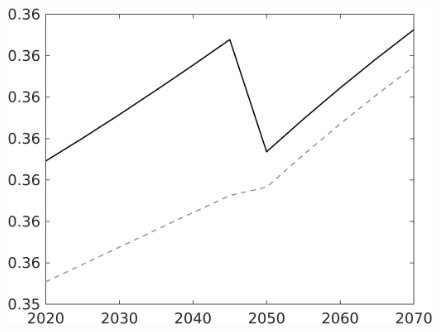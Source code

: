 \begin{figure}[h!!!]
\begin{minipage}[]{0.32\textwidth}
	\end{minipage}
	\begin{minipage}[]{0.32\textwidth}
		\includegraphics[width=1\textwidth]{../../codding_model/own_basedOnFried/optimalPol_010922_revision/figures/all_13Sept22_Tplus30/hh_OPT_COMPtaul_regime4_spillover0_knspil1_noskill1_sep0_xgrowth0_PV1_etaa0.79_lgd0.png}
	\end{minipage}
\end{figure} 
